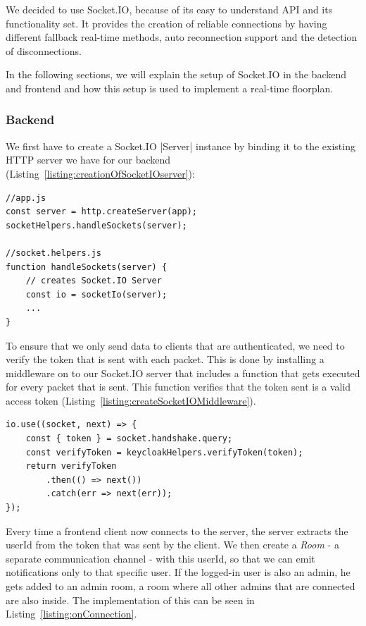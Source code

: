 We decided to use Socket.IO, because of its easy to understand API and its functionality set. It provides the creation of reliable connections by having different fallback real-time methods, auto reconnection support and the detection of disconnections.

In the following sections, we will explain the setup of Socket.IO in the backend and frontend and how this setup is used to implement a real-time floorplan.

\subsubsection{Backend}
\label{Backend}

We first have to create a Socket.IO |Server|\cite{socketio:server} instance by binding it to the existing HTTP server we have for our backend (Listing~\ref{listing:creationOfSocketIOserver}):

\begin{lstlisting}[label={listing:creationOfSocketIOserver},caption={Creation of Socket.IO server}]
//app.js
const server = http.createServer(app);
socketHelpers.handleSockets(server);

//socket.helpers.js
function handleSockets(server) {
    // creates Socket.IO Server
    const io = socketIo(server);
    ...
}
\end{lstlisting}

To ensure that we only send data to clients that are authenticated, we need to verify the token that is sent with each packet. This is done by installing a middleware on to our Socket.IO server that includes a function that gets executed for every packet that is sent. This function verifies that the token sent is a valid access token (Listing~\ref{listing:createSocketIOMiddleware}).

\begin{lstlisting}[label={listing:createSocketIOMiddleware},caption={Middleware of Socket.IO server}]
io.use((socket, next) => {
    const { token } = socket.handshake.query;
    const verifyToken = keycloakHelpers.verifyToken(token);
    return verifyToken
        .then(() => next())
        .catch(err => next(err));
});
\end{lstlisting}

Every time a frontend client now connects to the server, the server extracts the userId from the token that was sent by the client. We then create a \emph{Room}\cite{socketio:rooms} - a separate communication channel - with this userId, so that we can emit notifications only to that specific user. If the logged-in user is also an admin, he gets added to an admin room, a room where all other admins that are connected are also inside. The implementation of this can be seen in Listing~\ref{listing:onConnection}.

